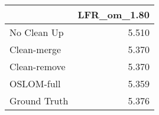 \begin{tabular}{lr}
\toprule
{} & LFR_om_1.80 \\
\midrule
No Clean Up  &       5.510 \\
Clean-merge  &       5.370 \\
Clean-remove &       5.370 \\
OSLOM-full   &       5.359 \\
Ground Truth &       5.376 \\
\bottomrule
\end{tabular}
